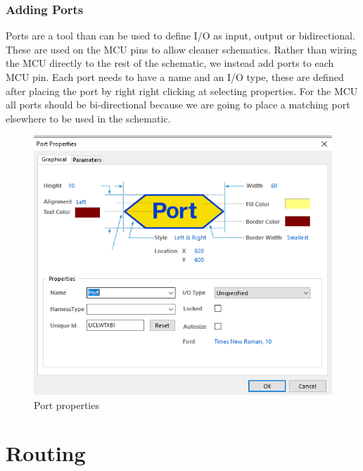 \documentclass{report}
\begin{document}
	\subsection{Adding Ports}
	Ports are a tool than can be used to define I/O as input, output or bidirectional. These are used on the MCU pins to allow cleaner schematics. Rather than wiring the MCU directly to the rest of the schematic, we instead add ports to each MCU pin. Each port needs to have a name and an I/O type, these are defined after placing the port by right right clicking at selecting properties. For the MCU all ports should be bi-directional because we are going to place a matching port elsewhere to be used in the schematic.
	\begin{figure}[H]	
		\centering
		\includegraphics[width=16cm]{pics/port_menu.png}
		\caption{Port properties}
		\label{port menu}
	\end{figure}
	
	\chapter{Routing}
	
\end{document}

